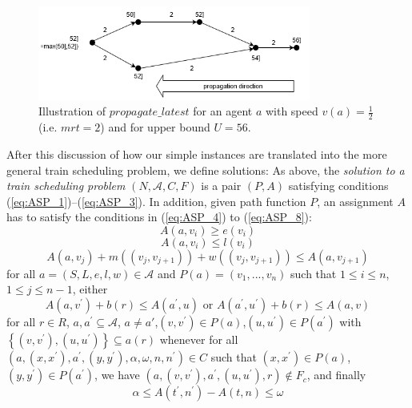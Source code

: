 \documentclass{article}
\begin{document}
\begin{figure}[hbtp]
	\centering
  \includegraphics[width=0.8\textwidth]{H1_propagate_latest.png}
	\caption{Illustration of $propagate\_latest$ for an agent $a$ with speed $v(a)=\frac{1}{2}$ (i.e. $mrt=2$) and for upper bound $U=56$.}
	\label{fig:propagate_latest}
\end{figure}



After this discussion of how our simple instances are translated into the more general train scheduling problem, we define solutions:
As above, the \emph{solution to a train scheduling problem} $(N, \mathcal{A}, C, F)$ is a pair $(P,A)$
satisfying conditions (\ref{eq:ASP_1})--(\ref{eq:ASP_3}).
In addition, given path function $P$, an assignment $A$ has to satisfy the conditions in (\ref{eq:ASP_4}) to (\ref{eq:ASP_8}):
\begin{equation}
A(a, v_i)\geq e(v_i)\label{eq:ASP_4}
\end{equation}
\begin{equation}
A(a, v_i)\leq l(v_i)\label{eq:ASP_5}
\end{equation}
\begin{equation}
A(a, v_j) +m((v_j, v_{j+1})) +w((v_j, v_{j+1}))\leq A(a, v_{j+1})\label{eq:ASP_6}
\end{equation}
for all $a= (S, L, e, l, w)\in\mathcal{A}$ and $P(a) = (v_1, . . . , v_n)$ such that $1\leq i\leq n$,$1\leq j\leq n-1$,
either
\begin{equation}
A(a, v^\prime) +b(r) \leq A(a^\prime, u) \textrm{ or }A(a^\prime, u^\prime) +b(r)\leq A(a, v) \label{eq:ASP_7}
\end{equation}
for all $r\in R$, ${a, a^\prime} \subseteq \mathcal{A}$, $a\not=a'$,$(v, v^\prime)\in P(a)$,$(u, u^\prime)\in P(a^\prime)$ with $\left\{(v, v^\prime),(u, u^\prime)\right\} \subseteq a(r)$ whenever for all $(a,(x, x^\prime), a^\prime,(y, y^\prime), \alpha, \omega, n, n^\prime)\in C$ such that $(x, x^\prime)\in P(a)$,$(y, y^\prime)\in P(a^\prime)$, we have $(a,(v, v^\prime), a^\prime,(u, u^\prime), r)\not\in F_c$, and finally
\begin{equation}
\alpha\leq A(t^\prime, n^\prime)-A(t, n)\leq \omega\label{eq:ASP_8}
\end{equation}
\end{document}
